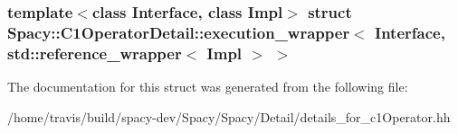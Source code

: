 \subsubsection*{template$<$class Interface, class Impl$>$ struct Spacy\-::\-C1\-Operator\-Detail\-::execution\-\_\-wrapper$<$ Interface, std\-::reference\-\_\-wrapper$<$ Impl $>$ $>$}



\-The documentation for this struct was generated from the following file\-:\begin{DoxyCompactItemize}
\item 
/home/travis/build/spacy-\/dev/\-Spacy/\-Spacy/\-Detail/details\-\_\-for\-\_\-c1\-Operator.\-hh\end{DoxyCompactItemize}
